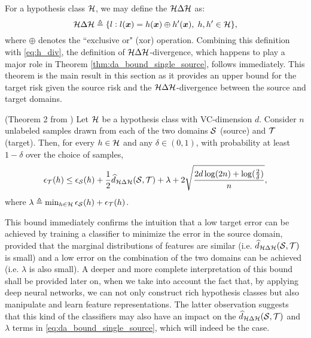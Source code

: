For a hypothesis class ${\mathcal{H}}$, we may define the  ${\mathcal{H}} \Delta {\mathcal{H}}$ as:
\begin{equation}
\label{eq:h_delta_h}
{\mathcal{H}} \Delta {\mathcal{H}} \triangleq \{l: l({\bm{x}}) = h({\bm{x}}) \oplus h'({\bm{x}}), \; h, h' \in {\mathcal{H}}\},
\end{equation}
where $\oplus$ denotes the ``exclusive or" (xor) operation. Combining this definition with \eqref{eq:h_div}, the definition of ${\mathcal{H}} \Delta {\mathcal{H}}$-divergence, which happens to play a major role in Theorem \ref{thm:da_bound_single_source}, follows immediately. This theorem is the main result in this section as it provides an upper bound for the target risk given the source risk and the ${\mathcal{H}} \Delta {\mathcal{H}}$-divergence between the source and target domains.
\begin{theorem}
	\label{thm:da_bound_single_source} (Theorem 2 from \citet{BenDavid2010}) Let ${\mathcal{H}}$ be a hypothesis class with VC-dimension $d$. Consider $n$ unlabeled samples drawn from each of the two domains ${\mathcal{S}}$ (source) and ${\mathcal{T}}$ (target). Then, for every $h \in {\mathcal{H}}$ and any $\delta \in (0,1)$, with probability at least $1-\delta$ over the choice of samples,
	\begin{equation}
		\label{eq:da_bound_single_source}
		\epsilon_{\mathcal{T}}(h) \leq \epsilon_{\mathcal{S}}(h) + \frac{1}{2} \widehat{d}_{{\mathcal{H}} \Delta {\mathcal{H}}}({\mathcal{S}}, {\mathcal{T}}) + \lambda + 2\sqrt{\frac{2d\log(2n) + \log(\frac{2}{\delta})}{n}},
	\end{equation}
	where $\lambda \triangleq \min_{h \in {\mathcal{H}}} \epsilon_{\mathcal{S}}(h) + \epsilon_{\mathcal{T}}(h)$.
\end{theorem}
This bound immediately confirms the intuition that a low target error can be achieved by training a classifier to minimize the error in the source domain, provided that the marginal distributions of features are similar (i.e. $\widehat{d}_{{\mathcal{H}} \Delta {\mathcal{H}}}({\mathcal{S}}, {\mathcal{T}})$ is small) and a low error on the combination of the two domains can be achieved (i.e. $\lambda$ is also small). A deeper and more complete interpretation of this bound shall be provided later on, when we take into account the fact that, by applying deep neural networks, we can not only construct rich hypothesis classes but also manipulate and learn feature representations. The latter observation suggests that this kind of the classifiers may also have an impact on the $\widehat{d}_{{\mathcal{H}} \Delta {\mathcal{H}}}({\mathcal{S}}, {\mathcal{T}})$ and $\lambda$ terms in \eqref{eq:da_bound_single_source}, which will indeed be the case.

